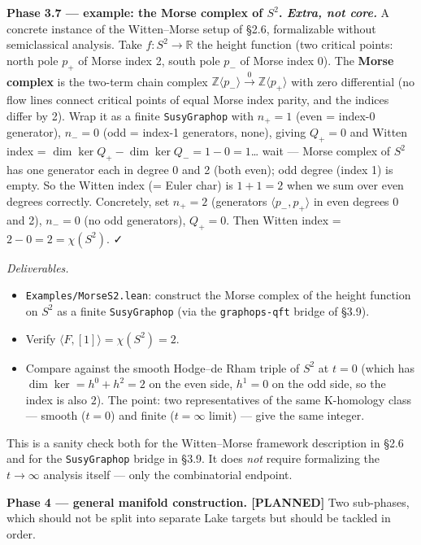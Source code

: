 \documentclass[
  11pt,
]{article}
\newcounter{none} %
\providecommand{\tightlist}{%
  \setlength{\itemsep}{0pt}\setlength{\parskip}{0pt}}
\begin{document}
\textbf{Phase 3.7 --- example: the Morse complex of \(S^2\).
\emph{Extra, not core.}} A concrete instance of the Witten--Morse setup
of §2.6, formalizable without semiclassical analysis. Take
\(f \colon S^2 \to \mathbb{R}\) the height function (two critical
points: north pole \(p_+\) of Morse index 2, south pole \(p_-\) of Morse
index 0). The \textbf{Morse complex} is the two-term chain complex
\(\mathbb{Z}\langle p_-\rangle \xrightarrow{0} \mathbb{Z}\langle p_+\rangle\)
with zero differential (no flow lines connect critical points of equal
Morse index parity, and the indices differ by 2). Wrap it as a finite
\texttt{SusyGraphop} with \(n_+ = 1\) (even = index-0 generator),
\(n_- = 0\) (odd = index-1 generators, none), giving \(Q_+ = 0\) and
Witten index = \(\dim\ker Q_+ - \dim\ker Q_- = 1 - 0 = 1\)\ldots{} wait
--- Morse complex of \(S^2\) has one generator each in degree 0 and 2
(both even); odd degree (index 1) is empty. So the Witten index (= Euler
char) is \(1 + 1 = 2\) when we sum over even degrees correctly.
Concretely, set \(n_+ = 2\) (generators \(\langle p_-, p_+\rangle\) in
even degrees 0 and 2), \(n_- = 0\) (no odd generators), \(Q_+ = 0\).
Then Witten index = \(2 - 0
= 2 = \chi(S^2)\). ✓

\emph{Deliverables.}

\begin{itemize}
\tightlist
\item
  \texttt{Examples/MorseS2.lean}: construct the Morse complex of the
  height function on \(S^2\) as a finite \texttt{SusyGraphop} (via the
  \texttt{graphops-qft} bridge of §3.9).
\item
  Verify \(\langle F, [1] \rangle = \chi(S^2) = 2\).
\item
  Compare against the smooth Hodge--de Rham triple of \(S^2\) at
  \(t = 0\) (which has \(\dim \ker = h^0 + h^2 = 2\) on the even side,
  \(h^1 = 0\) on the odd side, so the index is also \(2\)). The point:
  two representatives of the same K-homology class --- smooth (\(t=0\))
  and finite (\(t = \infty\) limit) --- give the same integer.
\end{itemize}

This is a sanity check both for the Witten--Morse framework description
in §2.6 and for the \texttt{SusyGraphop} bridge in §3.9. It does
\emph{not} require formalizing the \(t \to \infty\) analysis itself ---
only the combinatorial endpoint.

\textbf{Phase 4 --- general manifold construction. [PLANNED]} Two sub-phases,
which should not be split into separate Lake targets but should be
tackled in order.
\end{document}
